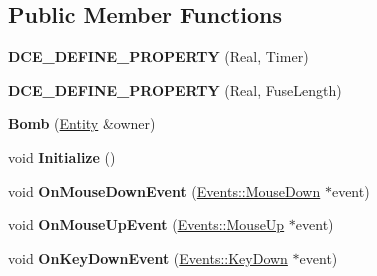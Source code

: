 \subsection*{Public Member Functions}
\begin{DoxyCompactItemize}
\item 
\hypertarget{classDCEngine_1_1Components_1_1Bomb_ad9553525682b3cacac64c746daef675e}{{\bfseries D\-C\-E\-\_\-\-D\-E\-F\-I\-N\-E\-\_\-\-P\-R\-O\-P\-E\-R\-T\-Y} (Real, Timer)}\label{classDCEngine_1_1Components_1_1Bomb_ad9553525682b3cacac64c746daef675e}

\item 
\hypertarget{classDCEngine_1_1Components_1_1Bomb_a3ec0025b6cc8ec3eb274ad68cf02bf89}{{\bfseries D\-C\-E\-\_\-\-D\-E\-F\-I\-N\-E\-\_\-\-P\-R\-O\-P\-E\-R\-T\-Y} (Real, Fuse\-Length)}\label{classDCEngine_1_1Components_1_1Bomb_a3ec0025b6cc8ec3eb274ad68cf02bf89}

\item 
\hypertarget{classDCEngine_1_1Components_1_1Bomb_aed9ec9f41dbeaa4b21349b3b400d80a6}{{\bfseries Bomb} (\hyperlink{classDCEngine_1_1Entity}{Entity} \&owner)}\label{classDCEngine_1_1Components_1_1Bomb_aed9ec9f41dbeaa4b21349b3b400d80a6}

\item 
\hypertarget{classDCEngine_1_1Components_1_1Bomb_aedf6483487c1709de90870ca255804a5}{void {\bfseries Initialize} ()}\label{classDCEngine_1_1Components_1_1Bomb_aedf6483487c1709de90870ca255804a5}

\item 
\hypertarget{classDCEngine_1_1Components_1_1Bomb_a60df6ef62a60fa0a92a919a4020ef22b}{void {\bfseries On\-Mouse\-Down\-Event} (\hyperlink{classDCEngine_1_1Events_1_1MouseDown}{Events\-::\-Mouse\-Down} $\ast$event)}\label{classDCEngine_1_1Components_1_1Bomb_a60df6ef62a60fa0a92a919a4020ef22b}

\item 
\hypertarget{classDCEngine_1_1Components_1_1Bomb_a6e3f1fdeab8186677b5d2055806d4718}{void {\bfseries On\-Mouse\-Up\-Event} (\hyperlink{classDCEngine_1_1Events_1_1MouseUp}{Events\-::\-Mouse\-Up} $\ast$event)}\label{classDCEngine_1_1Components_1_1Bomb_a6e3f1fdeab8186677b5d2055806d4718}

\item 
\hypertarget{classDCEngine_1_1Components_1_1Bomb_a86967fb464279f7e698617f688199bf6}{void {\bfseries On\-Key\-Down\-Event} (\hyperlink{classDCEngine_1_1Events_1_1KeyDown}{Events\-::\-Key\-Down} $\ast$event)}\label{classDCEngine_1_1Components_1_1Bomb_a86967fb464279f7e698617f688199bf6}


\end{DoxyCompactItemize}
